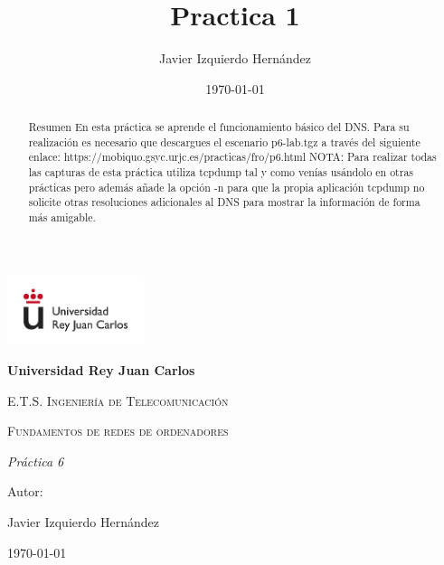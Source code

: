\documentclass[12pt, a4paper]{report}
\title{Practica 1}
\author{Javier Izquierdo Hernández}
\date{\today}
\begin{document}
	\begin{titlepage}
		\centering
		{\includegraphics[width=0.3\textwidth]{logo}\par}
		\vspace{1cm}
		{\bfseries\LARGE Universidad Rey Juan Carlos \par}
		\vspace{1cm}
		{\scshape\Large E.T.S. Ingeniería de Telecomunicación \par}
		\vspace{3cm}
		{\scshape\Huge Fundamentos de redes de ordenadores \par}
		\vspace{3cm}
		{\itshape\Large Práctica 6 \par}
		\vfill
		{\Large Autor: \par}
		{\Large Javier Izquierdo Hernández \par}
		\vfill
		{\Large \today \par}
	\end{titlepage}

\newpage
\renewcommand{\contentsname}{Contenidos}
\tableofcontents
\newpage

\begin{abstract}
Resumen En esta práctica se aprende el funcionamiento básico del DNS. Para su realización es necesario que descargues el escenario p6-lab.tgz a través del siguiente enlace: 
 https://mobiquo.gsyc.urjc.es/practicas/fro/p6.html 
 NOTA: Para realizar todas las capturas de esta práctica utiliza tcpdump tal y como venías usándolo en otras prácticas pero además añade la opción -n para que la propia aplicación tcpdump no solicite otras resoluciones adicionales al DNS para mostrar la información de forma más amigable.
\end{abstract}
\end{document}
